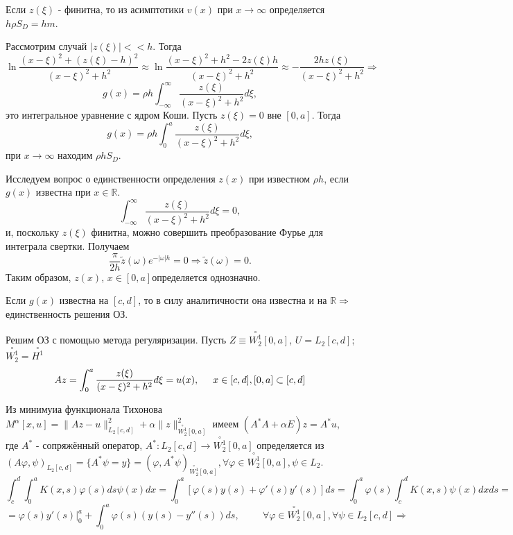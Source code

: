 \documentclass{article}
\begin{document}
Если $z(\xi)$ - финитна, то из асимптотики $v(x)$ при $x \rightarrow \infty$ определяется $h \rho S_D = hm$.

Рассмотрим случай $|z(\xi)| << h$. Тогда 
\[
\ln \dfrac{(x-\xi)^2 + (z(\xi) - h)^2}{(x-\xi)^2 + h^2} \approx 
\ln \dfrac{(x-\xi)^2 + h^2 - 2z(\xi)h}{(x-\xi)^2 + h^2} \approx
-\dfrac{2hz(\xi)}{(x-\xi)^2 + h^2} \Rightarrow
\]
\[
g(x) = \rho h \int_{-\infty}^{\infty} \dfrac{z(\xi)}{(x-\xi)^2 + h^2} d\xi,
\]
это интегральное уравнение с ядром Коши. Пусть $z(\xi) = 0$ вне $[0,a]$. Тогда
\[
g(x) = \rho h \int_{0}^{a} \dfrac{z(\xi)}{(x-\xi)^2 + h^2} d\xi,
\]
при $x \rightarrow \infty$ находим $\rho h S_D$.

Исследуем вопрос о единственности определения $z(x)$ при известном $\rho h$, если $g(x)$ известна при $x \in \mathbb{R}$.
\[
\int_{-\infty}^{\infty} \dfrac{z(\xi)}{(x-\xi)^2 + h^2} d\xi = 0,
\]
и, поскольку $z(\xi)$ финитна, можно совершить преобразование Фурье для интеграла свертки. Получаем
\[
\dfrac{\pi}{2h} \tilde{z}(\omega) e^{-|\omega|h} = 0 \Rightarrow \tilde{z}(\omega) = 0.
\]
Таким образом, $z(x)$, $x \in [0,a]$определяется однозначно.

Если $g(x)$ известна на $[c,d]$, то в силу аналитичности она известна и на $\mathbb{R} \Rightarrow$  единственность решения ОЗ.

Решим ОЗ с помощью метода регуляризации. Пусть $Z \equiv \overset{\circ}{W_2^1}[0,a]$, $U = L_2[c,d]$; $\overset{\circ}{W_2^1} = \overset{\circ}{H^1}$
\[
A z = \int_{0}^{a} \dfrac{z(\xi)}{(x-\xi)^2 + h^2} d\xi = u(x), \hspace{0.5cm} x \in [c,d], [0,a] \subset [c,d]
\]

Из минимуиа функционала Тихонова $M^{\alpha} [x,u] = \lVert Az - u \rVert_{L_2[c,d]}^2 + \alpha \lVert z \rVert_{\overset{\circ}{W_2^1}[0,a]}^2$ имеем  $(A^* A + \alpha E)z = A^* u$, где $A^*$ - сопряжённый оператор, $A^* : L_2[c,d] \rightarrow \overset{\circ}{W_2^1}[0,a]$ определяется из $(A \varphi, \psi)_{L_2[c,d]} = \{A^* \psi = y\} = (\varphi, A^* \psi)_{\overset{\circ}{W_2^1}[0,a]}, \forall \varphi \in \overset{\circ}{W_2^1}[0,a], \psi \in L_2$.
\[
\int_c^d \int_0^a K(x,s) \varphi(s) ds \psi(x) dx = 
\int_0^a [ \varphi(s) y(s) + \varphi'(s) y'(s)] ds =
\int_0^a \varphi(s) \int_c^d K(x,s) \psi(x) dx ds =
\]
\[
= \varphi(s) y'(s) \bigg|_0^a + \int_0^a \varphi(s)(y(s) - y''(s))ds, \hspace{1cm}
\forall \varphi \in \overset{\circ}{W_2^1}[0,a], \forall \psi \in L_2[c,d] \Rightarrow
\]
\end{document}
